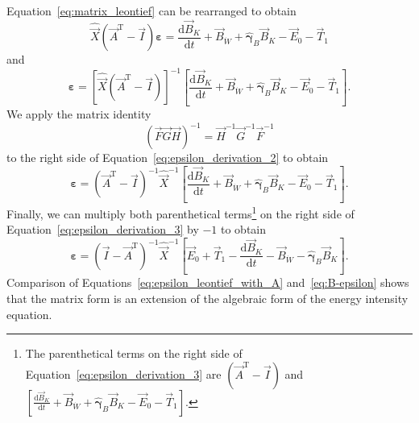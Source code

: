 Equation~\ref{eq:matrix_leontief} can be rearranged to obtain
%
\begin{equation} \label{eq:epsilon_derivation_1}
	\hat{\vec{X}} (\vec{A}^{\mathrm{T}} - \vec{I}) \boldsymbol{\varepsilon}
	= \frac{\mathrm{d}\vec{B}_{K}}{\mathrm{d}t}
	+ \vec{B}_{\dot{W}}
	+ \hat{\boldsymbol{\gamma}}_{B} \vec{B}_{K}
	- \vec{E}_{0}
	- \vec{T}_{1} 
\end{equation}
%
and
%
\begin{equation} \label{eq:epsilon_derivation_2}
	\boldsymbol{\varepsilon}
	= {\left[ \hat{\vec{X}} (\vec{A}^{\mathrm{T}} - \vec{I}) \right]}^{-1}
		\left[
			\frac{\mathrm{d}\vec{B}_{K}}{\mathrm{d}t}
			+ \vec{B}_{\dot{W}}
			+ \hat{\boldsymbol{\gamma}}_{B} \vec{B}_{K}
			- \vec{E}_{0}
			- \vec{T}_{1} 
		\right].
\end{equation}
%
We apply the matrix identity 
\cite[Formula~6.2, p.~308]{Beyer:1991vd}
%
\begin{equation} \label{eq:matrix_identity_Beyer}
	{\left(\vec{F}\vec{G}\vec{H}\right)}^{-1} 
	= \vec{H}^{-1} \vec{G}^{-1} \vec{F}^{-1}
\end{equation}
%
to the right side of Equation~\ref{eq:epsilon_derivation_2} to obtain
%
\begin{equation} \label{eq:epsilon_derivation_3}
	\boldsymbol{\varepsilon}
	= {(\vec{A}^{\mathrm{T}} - \vec{I})}^{-1} {\hat{\vec{X}}}^{-1} 
		\left[
			\frac{\mathrm{d}\vec{B}_{K}}{\mathrm{d}t}
			+ \vec{B}_{\dot{W}}
			+ \hat{\boldsymbol{\gamma}}_{B} \vec{B}_{K}
			- \vec{E}_{0}
			- \vec{T}_{1} 
		\right].
\end{equation}
%
Finally, we can multiply both parenthetical terms\footnote{The parenthetical
terms on the right side of Equation~\ref{eq:epsilon_derivation_3} 
are $(\vec{A}^{\mathrm{T}} - \vec{I})$ and
$
\left[
	\frac{\mathrm{d}\vec{B}_{K}}{\mathrm{d}t}
	+ \vec{B}_{\dot{W}}
	+ \hat{\boldsymbol{\gamma}}_{B} \vec{B}_{K}
	- \vec{E}_{0}
	- \vec{T}_{1} 
\right]
$.} 
on the right side of Equation~\ref{eq:epsilon_derivation_3} by $-1$ to obtain
%
\begin{equation} \label{eq:epsilon_leontief_with_A}
	\boldsymbol{\varepsilon} 
	= {(\vec{I} - \vec{A}^{\mathrm{T}})}^{-1}\hat{\vec{X}}^{-1}
		\left[\vec{E}_{0} 
				+ \vec{T}_{1} 
				- \frac{\mathrm{d}\vec{B}_{K}}{\mathrm{d}t} 
				- \vec{B}_{\dot{W}}
				- \hat{\boldsymbol{\gamma}}_{B}\vec{B}_{K}
		\right].
\end{equation}
%
Comparison of Equations~\ref{eq:epsilon_leontief_with_A}
and~\ref{eq:B-epsilon} shows that 
the matrix form is an extension of the algebraic form of the energy intensity equation.

